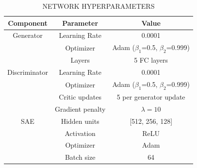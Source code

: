 \begin{table}[htbp]
\centering
\caption{NETWORK HYPERPARAMETERS}
\label{tab:hyperparams}
\begin{tabular}{ccc}
\toprule
Component & Parameter & Value \\
\midrule
Generator & Learning Rate & 0.0001 \\
 & Optimizer & Adam ($\beta_1$=0.5, $\beta_2$=0.999) \\
 & Layers & 5 FC layers \\
Discriminator & Learning Rate & 0.0001 \\
 & Optimizer & Adam ($\beta_1$=0.5, $\beta_2$=0.999) \\
 & Critic updates & 5 per generator update \\
 & Gradient penalty & $\lambda=10$ \\
SAE & Hidden units & [512, 256, 128] \\
 & Activation & ReLU \\
 & Optimizer & Adam \\
 & Batch size & 64 \\
\bottomrule
\end{tabular}
\end{table}
